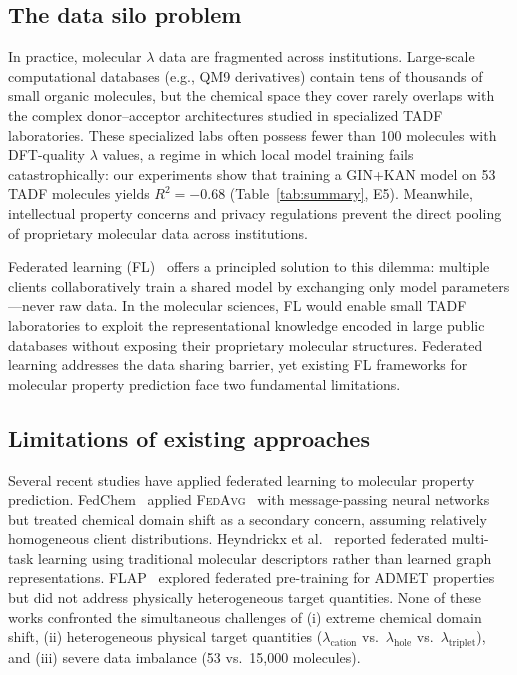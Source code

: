 \documentclass[twocolumn]{article}
\newcommand{\lam}{\lambda}
\newcommand{\lamhole}{\lambda_{\text{hole}}}
\newcommand{\lamcat}{\lambda_{\text{cation}}}
\newcommand{\lamtrip}{\lambda_{\text{triplet}}}
\newcommand{\Rsq}{R^{2}}
\newcommand{\FedAvg}{\textsc{FedAvg}}
\begin{document}
\subsection*{The data silo problem}

In practice, molecular $\lam$ data are fragmented across institutions.
Large-scale computational databases (e.g., QM9 derivatives) contain tens of thousands of small organic molecules, but the chemical space they cover rarely overlaps with the complex donor--acceptor architectures studied in specialized TADF laboratories.
These specialized labs often possess fewer than 100 molecules with DFT-quality $\lam$ values, a regime in which local model training fails catastrophically: our experiments show that training a GIN+KAN model on 53 TADF molecules yields $\Rsq = -0.68$ (Table~\ref{tab:summary}, E5).
Meanwhile, intellectual property concerns and privacy regulations prevent the direct pooling of proprietary molecular data across institutions.

Federated learning (FL)~\cite{McMahan2017_FedAvg} offers a principled solution to this dilemma: multiple clients collaboratively train a shared model by exchanging only model parameters---never raw data.
In the molecular sciences, FL would enable small TADF laboratories to exploit the representational knowledge encoded in large public databases without exposing their proprietary molecular structures.
Federated learning addresses the data sharing barrier, yet existing FL frameworks for molecular property prediction face two fundamental limitations.

\subsection*{Limitations of existing approaches}

Several recent studies have applied federated learning to molecular property prediction.
FedChem~\cite{FedChem2022} applied \FedAvg{}~\cite{McMahan2017_FedAvg} with message-passing neural networks but treated chemical domain shift as a secondary concern, assuming relatively homogeneous client distributions.
Heyndrickx et al.~\cite{Heyndrickx2023} reported federated multi-task learning using traditional molecular descriptors rather than learned graph representations.
FLAP~\cite{FLAP2023} explored federated pre-training for ADMET properties but did not address physically heterogeneous target quantities.
None of these works confronted the simultaneous challenges of (i) extreme chemical domain shift, (ii) heterogeneous physical target quantities ($\lamcat$ vs.\ $\lamhole$ vs.\ $\lamtrip$), and (iii) severe data imbalance (53 vs.\ 15{,}000 molecules).
\end{document}
